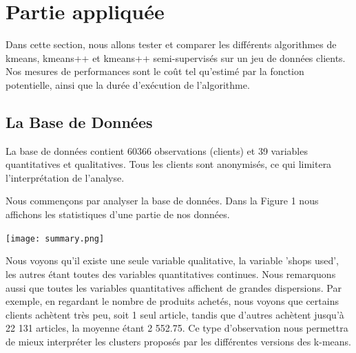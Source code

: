 \documentclass[12pt,a4paper]{book}
\newcommand{\1}{\mathds{1}}
\begin{document}
\section{Partie appliquée}



\vspace{5 mm}

\noindent
Dans cette section, nous allons tester et comparer les différents algorithmes de kmeans, kmeans++ et kmeans++ semi-supervisés sur un jeu de données clients. Nos mesures de performances sont le coût tel qu'estimé par la fonction potentielle, ainsi que la durée d'exécution de l'algorithme.

\vspace{10 mm}

\subsection{La Base de Données}

\vspace{5 mm}

\noindent
La base de données contient 60366 observations (clients) et 39 variables quantitatives et qualitatives. Tous les clients sont anonymisés, ce qui limitera l'interprétation de l'analyse.

\noindent
Nous commençons par analyser la base de données. Dans la Figure 1 nous affichons les statistiques d'une partie de nos données. 
\begin{center}
\texttt{[image: summary.png]}
\end{center}

\noindent
Nous voyons qu'il existe une seule variable qualitative, la variable 'shops used', les autres étant toutes des variables quantitatives continues. Nous remarquons aussi que toutes les variables quantitatives affichent de grandes dispersions. Par exemple, en regardant le nombre de produits achetés, nous voyons que certains clients achètent très peu, soit 1 seul article, tandis que d'autres achètent jusqu'à 22 131 articles, la moyenne étant 2 552.75. Ce type d'observation nous permettra de mieux interpréter les clusters proposés par les différentes versions des k-means.
\end{document}

